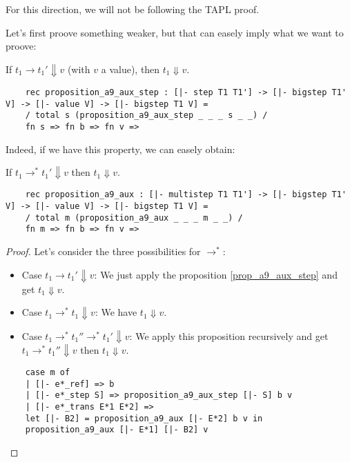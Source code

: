 For this direction, we will not be following the TAPL proof.

Let's first proove something weaker, but that can easely imply what we want to
proove:

\begin{proposition}\label{prop_a9_aux_step}
  If $t_1 \longrightarrow t_1' \Downarrow v$ (with $v$ a value),
  then $t_1 \Downarrow v$.
  \begin{lstlisting}
    rec proposition_a9_aux_step : [|- step T1 T1'] -> [|- bigstep T1' V] -> [|- value V] -> [|- bigstep T1 V] =
    / total s (proposition_a9_aux_step _ _ _ s _ _) /
    fn s => fn b => fn v =>
  \end{lstlisting}
\end{proposition}

Indeed, if we have this property, we can easely obtain:

\begin{proposition}[A9-aux]\label{prop_a9_aux}
  If $t_1 \longrightarrow^* t_1' \Downarrow v$ then $t_1 \Downarrow v$.
  \begin{lstlisting}
    rec proposition_a9_aux : [|- multistep T1 T1'] -> [|- bigstep T1' V] -> [|- value V] -> [|- bigstep T1 V] =
    / total m (proposition_a9_aux _ _ _ m _ _) /
    fn m => fn b => fn v =>
  \end{lstlisting}
\end{proposition}
\begin{proof}
  Let's consider the three possibilities for $\rightarrow^*$:
  \begin{itemize}
  \item Case $t_1 \longrightarrow t_1' \Downarrow v$: We just apply the
    proposition \ref{prop_a9_aux_step} and get $t_1 \Downarrow v$.
  \item Case $t_1 \longrightarrow^* t_1 \Downarrow v$: We have
    $t_1 \Downarrow v$.
  \item Case $t_1 \longrightarrow^* t_1'' \longrightarrow^* t_1' \Downarrow v$:
    We apply this proposition recursively and get $t_1 \longrightarrow^* t_1''
    \Downarrow v$ then $t_1 \Downarrow v$.
  \end{itemize}
  \begin{lstlisting}
    case m of
    | [|- e*_ref] => b
    | [|- e*_step S] => proposition_a9_aux_step [|- S] b v
    | [|- e*_trans E*1 E*2] =>
    let [|- B2] = proposition_a9_aux [|- E*2] b v in
    proposition_a9_aux [|- E*1] [|- B2] v
  \end{lstlisting}
\end{proof}

